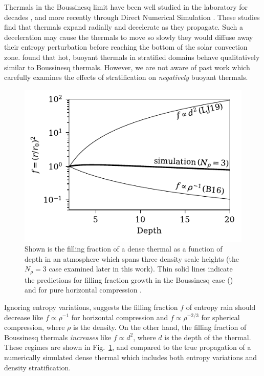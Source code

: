 Thermals in the Boussinesq limit have been well studied in the laboratory for decades \cite[see e.g.][]{morton&all1956, scorer1957}, and more recently through Direct Numerical Simulation \cite[DNS,][]{lecoanet&jeevanjee2018}. 
These studies find that thermals expand radially and decelerate as they propagate.
Such a deceleration may cause the thermals to move so slowly they would diffuse away their entropy perturbation before reaching the bottom of the solar convection zone.
\citet{brandenburg&hazlehurst2001} found that hot, buoyant thermals in stratified domains behave qualitatively similar to Boussinesq thermals.
However, we are not aware of past work which carefully examines the effects of stratification on \emph{negatively} buoyant thermals.


\begin{figure}[p!]
    \includegraphics[width=\columnwidth]{./figs/overview_fig.pdf}
    \caption[Filling factor evolution of entropy raindrops according to limiting theories and simulations.]
	{
	Shown is the filling fraction of a dense thermal as a function of depth in an atmosphere which spans three density scale heights (the $N_\rho = 3$ case examined later in this work). 
	Thin solid lines indicate the predictions for filling fraction growth in the Boussinesq case (\LJ) and for pure horizontal compression \cite[B16,][]{brandenburg2016}.
    \label{fig:overview} }
\end{figure}

Ignoring entropy variations, \citet{brandenburg2016} suggests the filling fraction $f$ of entropy rain should decrease like $f \propto \rho^{-1}$ for horizontal compression and $f \propto \rho^{-2/3}$ for spherical compression, where $\rho$ is the density.
On the other hand, the filling fraction of Boussinesq thermals \emph{increases} like $f \propto d^2$, where $d$ is the depth of the thermal.
These regimes are shown in Fig.~\ref{fig:overview}, and compared to the true propagation of a numerically simulated dense thermal which includes both entropy variations and density stratification.

